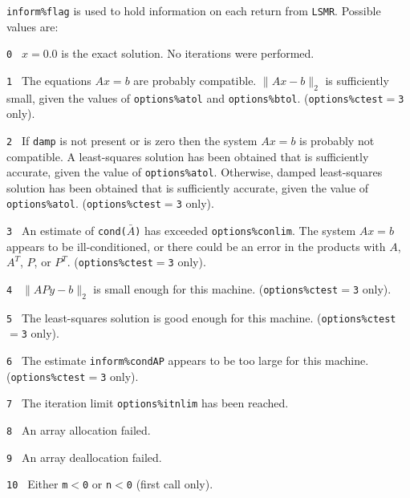 {\tt inform\%flag} is used to hold
information on each return from {\tt LSMR}. 
Possible values are:
\begin{description}
\item{\tt 0 }    $x = 0.0$  is the exact solution.
                   No iterations were performed.
\item{\tt 1 }           The equations $Ax = b$ are probably compatible.
                        $\|Ax - b\|_2$ is sufficiently small, given the
                        values of {\tt options\%atol} and {\tt options\%btol}. 
                        ({\tt options\%ctest}$ = ${\tt 3} only). 
    
\item{\tt 2 }       If {\tt damp} is not present or is zero then the system $Ax = b$ is probably
                     not compatible.  A least-squares solution has
                     been obtained that is sufficiently accurate,
                     given the value of {\tt options\%atol}.  
                     Otherwise, damped least-squares
                        solution has been obtained that is sufficiently
                        accurate, given the value of {\tt options\%atol}. 
                        ({\tt options\%ctest}$ = ${\tt 3} only). 
    
\item{\tt 3 }       An estimate of {\tt cond($\bar{A}$)} has exceeded {\tt options\%conlim}.
                        The system $Ax = b$ appears to be ill-conditioned,
                        or there could be an error in the products 
                        with $A$, $A^T$, $P$, or $P^T$.
                        ({\tt options\%ctest}$ = ${\tt 3} only). 
    
\item{\tt 4 }      $\|APy - b \|_2$ is small enough for this machine.
                        ({\tt options\%ctest}$ = ${\tt 3} only). 
    
\item{\tt 5 }       The least-squares solution is good enough for this
                        machine. ({\tt options\%ctest}$ = ${\tt 3} only). 
    
\item{\tt 6 }       The estimate {\tt inform\%condAP} appears to be too large 
                        for this machine.         
                        ({\tt options\%ctest}$ = ${\tt 3} only). 


\item{\tt 7 }       The iteration limit {\tt options\%itnlim} has been reached. 
\item{\tt 8 }       An array allocation failed.
\item{\tt 9 }       An array deallocation failed.
\item{\tt 10 }      Either  {\tt m$<$0} or {\tt n$<$0} (first call only).

\end{description}

